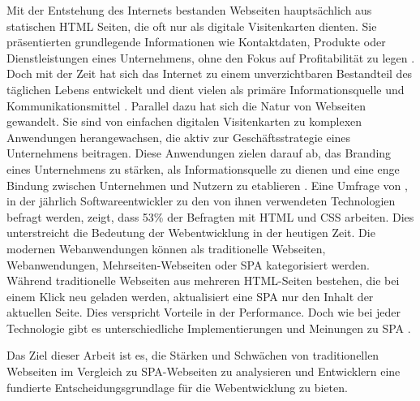 

Mit der Entstehung des Internets bestanden Webseiten hauptsächlich aus statischen \ac{HTML} Seiten, die oft nur als digitale Visitenkarten dienten. 
Sie präsentierten grundlegende Informationen wie Kontaktdaten, Produkte oder Dienstleistungen eines Unternehmens, ohne den Fokus auf Profitabilität zu legen \cite{Bly2018}.
Doch mit der Zeit hat sich das Internet zu einem unverzichtbaren Bestandteil des täglichen Lebens entwickelt und dient vielen als primäre Informationsquelle und Kommunikationsmittel \cite{conf/pi/Sassenberg}.
Parallel dazu hat sich die Natur von Webseiten gewandelt. 
Sie sind von einfachen digitalen Visitenkarten zu komplexen Anwendungen herangewachsen, die aktiv zur Geschäftsstrategie eines Unternehmens beitragen. 
Diese Anwendungen zielen darauf ab, das Branding eines Unternehmens zu stärken, als Informationsquelle zu dienen und eine enge Bindung zwischen Unternehmen und Nutzern zu etablieren \cite{Bly2018}.
Eine Umfrage von  \cite{StackOverflow2023}, in der jährlich Softwareentwickler zu den von ihnen verwendeten Technologien befragt werden, zeigt, dass 53\% der Befragten mit \ac{HTML} und \ac{CSS} arbeiten.
Dies unterstreicht die Bedeutung der Webentwicklung in der heutigen Zeit.
Die modernen Webanwendungen können als traditionelle Webseiten, Webanwendungen, Mehrseiten-Webseiten oder \ac{SPA} kategorisiert werden. 
Während traditionelle Webseiten aus mehreren \ac{HTML}-Seiten bestehen, die bei einem Klick neu geladen werden, aktualisiert eine \ac{SPA} nur den Inhalt der aktuellen Seite. 
Dies verspricht Vorteile in der Performance. Doch wie bei jeder Technologie gibt es unterschiedliche Implementierungen und Meinungen zu \ac{SPA} \cite{Flanagan2011}.

Das Ziel dieser Arbeit ist es, die Stärken und Schwächen von traditionellen Webseiten im Vergleich zu SPA-Webseiten zu analysieren und Entwicklern eine fundierte Entscheidungsgrundlage für die Webentwicklung zu bieten.


